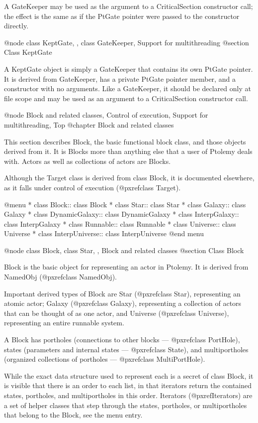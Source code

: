 A GateKeeper may be used as the argument to a CriticalSection
constructor call; the effect is the same as if the PtGate pointer were
passed to the constructor directly.

@node class KeptGate,  , class GateKeeper, Support for multithreading
@section Class KeptGate

A KeptGate object is simply a GateKeeper that contains its own PtGate
pointer.  It is derived from GateKeeper, has a private PtGate pointer
member, and a constructor with no arguments.  Like a GateKeeper, it
should be declared only at file scope and may be used as an argument
to a CriticalSection constructor call.

@node Block and related classes, Control of execution, Support for multithreading, Top
@chapter Block and related classes

This section describes Block, the basic functional block class, and
those objects derived from it.  It is Blocks more than anything else
that a user of Ptolemy deals with.  Actors as well as collections of
actors are Blocks.

Although the Target class is derived from class Block, it is documented
elsewhere, as it falls under control of execution (@pxref{class Target}).

@menu
* class Block::     class Block
* class Star::      class Star
* class Galaxy::    class Galaxy
* class DynamicGalaxy::  class DynamicGalaxy
* class InterpGalaxy::  class InterpGalaxy
* class Runnable::  class Runnable
* class Universe::  class Universe
* class InterpUniverse::  class InterpUniverse
@end menu

@node class Block, class Star,  , Block and related classes
@section Class Block

Block is the basic object for representing an actor in Ptolemy.
It is derived from NamedObj (@pxref{class NamedObj}).

Important derived types of Block are Star (@pxref{class Star}),
representing an atomic actor;
Galaxy (@pxref{class Galaxy}),
representing a collection of actors that can be thought of as
one actor, and Universe (@pxref{class Universe}),
representing an entire runnable system.

A Block has portholes (connections to other blocks
--- @pxref{class PortHole}),
states (parameters and internal states --- @pxref{class State}),
and multiportholes (organized collections of portholes
--- @pxref{class MultiPortHole}).

While the exact data structure used to represent each is a secret of
class Block, it is visible that there is an order to each list, in that
iterators return the contained states, portholes, and multiportholes in
this order.  Iterators (@pxref{Iterators}) are a set of helper classes
that step through the states, portholes, or multiportholes that belong
to the Block, see the menu entry.

